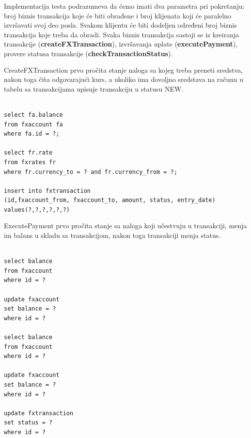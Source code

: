 \documentclass[12pt,oneside]{memoir}
\begin{document}
Implementacija testa podrazumeva da ćemo imati dva parametra pri pokretanju: broj biznis transakcija koje će biti obrađene i broj klijenata koji će paralelno izvršavati svoj deo posla. Svakom klijentu će biti dodeljen određeni broj biznis transakcija koje treba da obradi. Svaka biznis transakcija sastoji se iz kreiranja transakcije (\textbf{createFXTransaction}), izvršavanja uplate (\textbf{executePayment}), provere statusa transakcije (\textbf{checkTransactionStatus}). 

CreateFXTransaction prvo pročita stanje naloga sa kojeg treba preneti sredstva, nakon toga čita odgovarajući kurs, a ukoliko ima dovoljno sredstava na računu u tabelu sa transakcijama upisuje transakciju u statusu NEW.


\begin{lstlisting}[title={CreateFXTransaction},captionpos=t]

select fa.balance
from fxaccount fa
where fa.id = ?;

select fr.rate
from fxrates fr
where fr.currency_to = ? and fr.currency_from = ?;

insert into fxtransaction
(id,fxaccount_from, fxaccount_to, amount, status, entry_date)
values(?,?,?,?,?,?)

\end{lstlisting}

ExecutePayment prvo pročita stanje sa naloga koji učestvuju u transakciji, menja im balans u skladu sa transakcijom, nakon toga transakciji menja status.




\begin{lstlisting}[title={ExecutePayment},captionpos=t]

select balance
from fxaccount
where id = ?

update fxaccount
set balance = ?
where id = ?

select balance
from fxaccount
where id = ?

update fxaccount
set balance = ?
where id = ?

update fxtransaction
set status = ?
where id = ?

\end{lstlisting}
\end{document}
